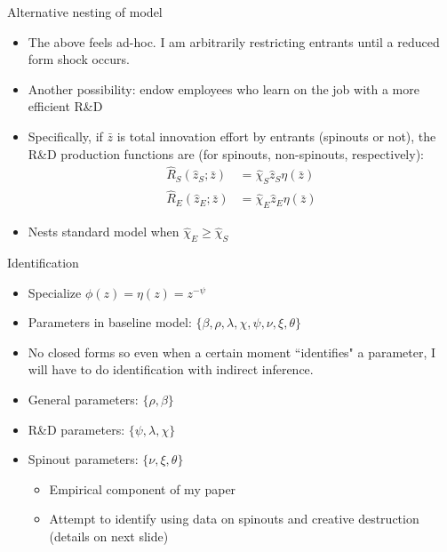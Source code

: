 \documentclass[english,usenames,dvipsnames]{beamer}
\begin{document}
\begin{frame}{Alternative nesting of model}
\begin{itemize}
	\item The above feels ad-hoc. I am arbitrarily restricting entrants until a reduced form shock occurs.
	\item Another possibility: endow employees who learn on the job with a more efficient R\&D
	\item Specifically, if $\bar{z}$ is total innovation effort by entrants (spinouts or not), the R\&D production functions are (for spinouts, non-spinouts, respectively):
	\begin{align*}
		\hat{R}_S (\hat{z}_S; \bar{z}) &= \hat{\chi}_S \hat{z}_S \eta(\bar{z}) \\ 
		\hat{R}_E (\hat{z}_E; \bar{z}) &= \hat{\chi}_E \hat{z}_E \eta(\bar{z}) 
	\end{align*}
	\item Nests standard model when $\hat{\chi}_E \ge \hat{\chi}_S$
\end{itemize}
\end{frame}

\begin{frame}{Identification}
\begin{itemize}
	\item Specialize $\phi(z) = \eta(z) = z^{-\psi}$
	\item Parameters in baseline model: $\{\beta,\rho,\lambda,\chi,\psi,\nu,\xi,\theta\}$
	\item No closed forms so even when a certain moment ``identifies" a parameter, I will have to do identification with indirect inference. 
	\item General parameters: $\{\rho,\beta\}$
	\item R\&D parameters: $\{\psi,\lambda, \chi\}$
	\item Spinout parameters: $\{ \nu,\xi,\theta \}$
	\begin{itemize}
		\item Empirical component of my paper
		\item Attempt to identify using data on spinouts and creative destruction (details on next slide)
	\end{itemize}
\end{itemize}
\end{frame}
\end{document}
